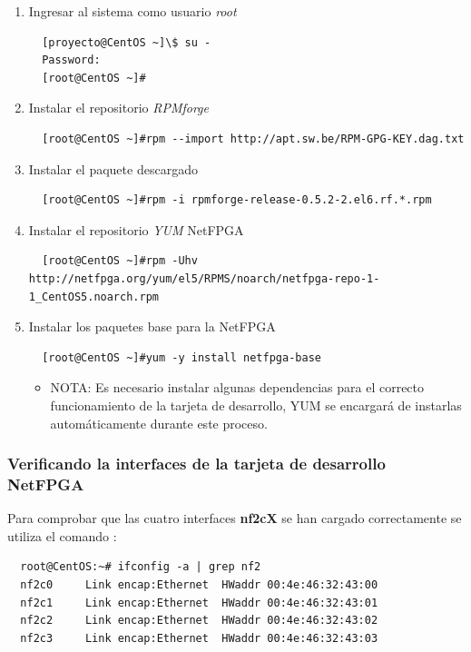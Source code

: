 \begin{enumerate}
 \item Ingresar al sistema como usuario \emph{root}
   \begin{verbatim}
  [proyecto@CentOS ~]\$ su -
  Password: 
  [root@CentOS ~]#
  \end{verbatim}
  
 \item Instalar el repositorio \emph{RPMforge}
    \begin{verbatim}
  [root@CentOS ~]#rpm --import http://apt.sw.be/RPM-GPG-KEY.dag.txt
  \end{verbatim}
  
   \item Instalar el paquete descargado
    \begin{verbatim}
  [root@CentOS ~]#rpm -i rpmforge-release-0.5.2-2.el6.rf.*.rpm
  \end{verbatim}
  
     \item Instalar el  repositorio \emph{YUM} NetFPGA 
    \begin{verbatim}
  [root@CentOS ~]#rpm -Uhv
http://netfpga.org/yum/el5/RPMS/noarch/netfpga-repo-1-1_CentOS5.noarch.rpm 
  \end{verbatim}
  
       \item Instalar los paquetes base para la  NetFPGA 
    \begin{verbatim}
  [root@CentOS ~]#yum -y install netfpga-base
  \end{verbatim}
  
  \begin{itemize}
   \item NOTA: Es necesario instalar algunas dependencias para el correcto
funcionamiento de la tarjeta de desarrollo, YUM se encargará de instarlas
automáticamente durante este proceso.
  \end{itemize}  
\end{enumerate}

\subsubsection{Verificando la interfaces de la tarjeta de desarrollo NetFPGA}

Para comprobar que las cuatro interfaces \textbf{nf2cX} se han cargado
correctamente se utiliza el comando :

  \begin{verbatim}
  root@CentOS:~# ifconfig -a | grep nf2 
  nf2c0     Link encap:Ethernet  HWaddr 00:4e:46:32:43:00  
  nf2c1     Link encap:Ethernet  HWaddr 00:4e:46:32:43:01  
  nf2c2     Link encap:Ethernet  HWaddr 00:4e:46:32:43:02  
  nf2c3     Link encap:Ethernet  HWaddr 00:4e:46:32:43:03  
  \end{verbatim}

